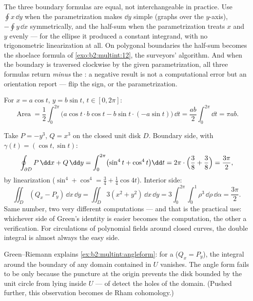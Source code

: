 \begin{remark}
The three boundary formulas are equal, not interchangeable in
practice. Use $\oint x\,\dd y$ when the parametrization makes
$\dd y$ simple (graphs over the $y$-axis), $-\oint y\,\dd x$
symmetrically, and the  half-sum when the
parametrization treats $x$ and $y$ evenly --- for the ellipse
it produced a constant integrand, with no trigonometric
linearization at all. On polygonal boundaries the half-sum
becomes the shoelace formula of \cref{exo:b2:multint:12},
the surveyors' algorithm. And when the boundary is traversed
clockwise by the given parametrization, all three formulas
return \emph{minus} the : a negative result is not a
computational error but an orientation report --- flip the
sign, or the parametrization.
\end{remark}

\begin{example}\label{ex:b2:multint:ellipsearea}
For $x = a\cos t$, $y = b\sin t$, $t \in [0, 2\pi]$:
\[
\operatorname{Area}
= \frac12\int_0^{2\pi}\bigl(a\cos t \cdot b\cos t
- b\sin t\cdot(-a\sin t)\bigr)\,\dd t
= \frac{ab}{2}\int_0^{2\pi}\dd t = \pi ab .
\]
\end{example}

\begin{example}\label{ex:b2:multint:greencheck}
Take $P = -y^3$, $Q = x^3$ on the closed unit disk $D$.
Boundary side, with $\gamma(t) = (\cos t, \sin t)$:
\[
\oint_{\partial D}P\,\dd x + Q\,\dd y
= \int_0^{2\pi}\bigl(\sin^4 t + \cos^4 t\bigr)\dd t
= 2\pi\cdot\Bigl(\frac38 + \frac38\Bigr) = \frac{3\pi}2 ,
\]
by linearization ($\sin^4 + \cos^4 = \tfrac34 +
\tfrac14\cos4t$). Interior side:
\[
\iint_D(Q_x - P_y)\,\dd x\,\dd y
= \iint_D 3(x^2 + y^2)\,\dd x\,\dd y
= 3\int_0^{2\pi}\!\!\int_0^1\rho^3\,\dd\rho\,\dd\alpha
= \frac{3\pi}2 .
\]
Same number, two very different computations --- and that is
the practical use: whichever side of Green's identity is
easier becomes the computation, the other a verification. For
circulations of polynomial fields around closed curves, the
double integral is almost always the easy side.
\end{example}

\begin{remark}
Green--Riemann explains \cref{ex:b2:multint:angleform}: for a
 ($Q_x = P_y$), the integral around the boundary of any
domain contained in $U$ vanishes. The angle form fails to be 
only because the puncture at the origin prevents the disk bounded
by the unit circle from lying inside $U$ ---  of
 detect the holes of the domain. (Pushed further,
this observation becomes de Rham cohomology.)
\end{remark}

